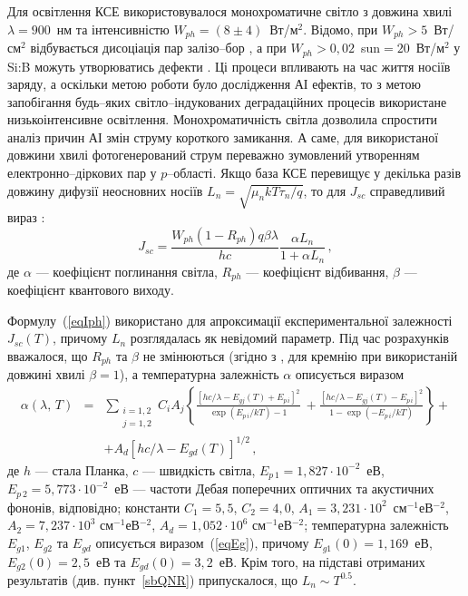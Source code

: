 Для освітлення КСЕ використовувалося монохроматичне світло з довжина хвилі $\lambda=900$~нм та інтенсивністю $W_{ph}=(8\pm4)$~Вт/м$^2$.
Відомо, при $W_{ph}>5$~Вт/см$^2$ відбувається дисоціація пар залізо--бор \cite{LID:CuII},
а при $W_{ph}>0,02$~sun$=20$~Вт/м$^2$
у Si:B можуть утворюватись дефекти \cite{BO:Halam2016}.
Ці процеси впливають на час життя носіїв заряду, а оскільки метою роботи було дослідження АІ ефектів,
то з метою запобігання будь--яких світло--індукованих деградаційних процесів використане
низькоінтенсивне освітлення.
Монохроматичність світла дозволила спростити аналіз причин АІ змін струму короткого замикання.
А саме, для використаної довжини хвилі фотогенерований струм переважно зумовлений утворенням електронно--діркових пар у $p$--області.
Якщо база КСЕ перевищує у декілька разів довжину дифузії неосновних носіїв $L_n=\sqrt{\mu_nkT\tau_n/q}$, то
для $J_{sc}$ справедливий вираз \cite{Markvart,Razeghi,Faren}:
\begin{equation}
\label{eqIph}
J_{sc} = \frac{W_{ph}(1-R_{ph})q\beta\lambda}{hc}\frac{\alpha L_n}{1+ \alpha L_n}\,,
\end{equation}
де
$\alpha$ --- коефіцієнт поглинання світла,
$R_{ph}$ --- коефіцієнт відбивання,
$\beta$ --- коефіцієнт квантового виходу.

Формулу~(\ref{eqIph}) використано для апроксимації експериментальної залежності $J_{sc}(T)$,
причому $L_n$ розглядалась як невідомий параметр.
Під час розрахунків вважалося, що $R_{ph}$ та $\beta$ не змінюються (згідно з \cite{Gaman}, для кремнію
при використаній довжині хвилі $\beta=1$),
а температурна залежність $\alpha$ описується виразом \cite{Markvart,Si:Absorb}
\begin{eqnarray}
\label{eqAlpha}
\nonumber \alpha(\lambda,\,T)&=&\sum_{\substack{i=1,2\\j=1,2}}\!C_iA_j\left\{\frac{[hc/\lambda-E_{gj}(T)+E_{p\,i}]^2}{\exp(E_{p\,i}/kT)-1}\:+
\frac{[hc/\lambda-E_{gj}(T)-E_{p\,i}]^2}{1-\exp(-E_{p\,i}/kT)}\right\}+\\
&&+A_d\left[hc/\lambda-E_{gd}(T)\right]^{1/2}\,,
\end{eqnarray}
де
$h$ --- стала Планка,
$c$ --- швидкість світла,
$E_{p\,1}=1,827\cdot10^{-2}$~еВ,
$E_{p\,2}=5,773\cdot10^{-2}$~еВ --- частоти Дебая поперечних
оптичних та акустичних фононів, відповідно;
константи $C_1=5,5$,
$C_2=4,0$,
$A_1=3,231\cdot10^2$~см$^{-1}$еВ$^{-2}$,
$A_2=7,237\cdot10^3$ см$^{-1}$еВ$^{-2}$,
$A_d=1,052\cdot10^6$ см$^{-1}$еВ$^{-2}$;
температурна залежність $E_{g1}$, $E_{g2}$ та $E_{gd}$ описується виразом~(\ref{eqEg}),
причому $E_{g1}(0)=1,169$~еВ, $E_{g2}(0)=2,5$~еВ та $E_{gd}(0)=3,2$~еВ.
Крім того, на підставі отриманих результатів (див. пункт~\ref{sbQNR}) припускалося, що $L_n\sim T^{0.5}$.

